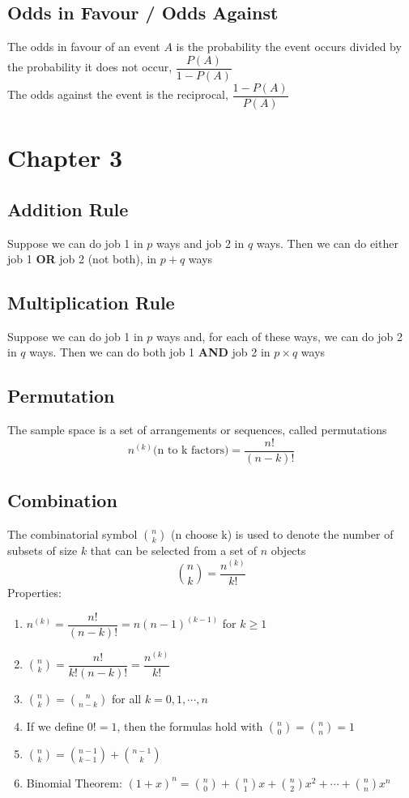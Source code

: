 \documentclass[11pt]{article}
\begin{document}
\subsection{Odds in Favour / Odds Against }
The odds in favour of an event $A$ is the probability the event occurs divided by the probability it does not occur, $\dfrac{P(A)}{1-P(A)}$ \\
The odds against the event is the reciprocal, $\dfrac{1-P(A)}{P(A)}$

\section{Chapter 3}
\subsection{Addition Rule}
Suppose we can do job 1 in $p$ ways and job 2 in $q$ ways. Then we can do either job 1 \textbf{OR} job 2 (not both), in $p+q$ ways
\subsection{Multiplication Rule}
Suppose we can do job 1 in $p$ ways and, for each of these ways, we can do job 2 in $q$ ways. Then we can do both job 1 \textbf{AND} job 2 in $p\times q$ ways 
\subsection{Permutation}
The sample space is a set of arrangements or sequences, called permutations \[n^{(k)} \text{(n to k factors)} = \frac{n!}{(n-k)!}\]
\subsection{Combination}
The combinatorial symbol $\binom{n}{k}$ (n choose k) is used to denote the number of subsets of size $k$ that can be selected from a set of $n$ 
objects \[{\binom{n}{k}} = \frac{n^{(k)}}{k!}\]
Properties:
\begin{enumerate}
    \item $n^{(k)} = \dfrac{n!}{(n-k)!} = n(n-1)^{(k-1)}$ for $k\geq1$
    \item ${\binom{n}{k}} = \dfrac{n!}{k!(n-k)!} = \dfrac{n^{(k)}}{k!}$
    \item ${\binom{n}{k}} = {\binom{n}{n-k}}$ for all $k=0,1,\cdots,n$
    \item If we define $0!=1$, then the formulas hold with ${\binom{n}{0}} = {\binom{n}{n}} = 1$
    \item ${n\choose k} = {n-1\choose k-1} + {n-1\choose k}$
    \item Binomial Theorem: $(1+x)^n = {n\choose0} + {n\choose1}x + {n\choose2}x^2 + \cdots + {n\choose n}x^n$
\end{enumerate}
\end{document}
